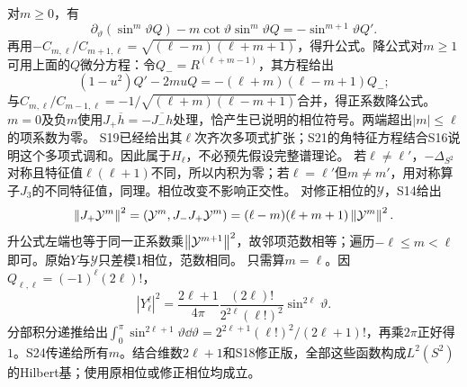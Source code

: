 \documentclass[UTF8,fontset=fandol,11pt]{ctexart}
\begin{document}
对$m\ge0$，有
\[\partial_\vartheta(\sin^m\vartheta Q)-m\cot\vartheta\sin^m\vartheta Q=-\sin^{m+1}\vartheta Q'.\]
再用$-C_{m,\ell}/C_{m+1,\ell}=\sqrt{(\ell-m)(\ell+m+1)}$，得升公式。降公式对$m\ge1$可用上面的$Q$微分方程：令$Q_-=R^{(\ell+m-1)}$，其方程给出
\[(1-u^2)Q'-2muQ=-(\ell+m)(\ell-m+1)Q_-;\]
与$C_{m,\ell}/C_{m-1,\ell}=-1/\sqrt{(\ell+m)(\ell-m+1)}$合并，得正系数降公式。$m=0$及负$m$使用$J_+\overline h=-\overline{J_-h}$处理，恰产生已说明的相位符号。两端超出$|m|\le\ell$的项系数为零。
S19已经给出其$\ell$次齐次多项式扩张；S21的角特征方程结合S16说明这个多项式调和。因此属于$H_\ell$，不必预先假设完整谱理论。
若$\ell\ne\ell'$，$-\Delta_{S^2}$对称且特征值$\ell(\ell+1)$不同，所以内积为零；若$\ell=\ell'$但$m\ne m'$，用对称算子$J_3$的不同特征值，同理。相位改变不影响正交性。
对修正相位的$\mathcal Y$，S14给出
\[\left\lVert J_+\mathcal Y^m\right\rVert^2=(\mathcal Y^m,J_-J_+\mathcal Y^m)=(\ell-m)(\ell+m+1)\left\lVert\mathcal Y^m\right\rVert^2.\]
升公式左端也等于同一正系数乘$\left\lVert\mathcal Y^{m+1}\right\rVert^2$，故邻项范数相等；遍历$-\ell\le m<\ell$即可。原始$Y$与$\mathcal Y$只差模$1$相位，范数相同。
只需算$m=\ell$。因$Q_{\ell,\ell}=(-1)^\ell(2\ell)!$，
\[|Y_\ell^\ell|^2=\frac{2\ell+1}{4\pi}\frac{(2\ell)!}{2^{2\ell}(\ell!)^2}\sin^{2\ell}\vartheta.\]
分部积分递推给出$\int_0^\pi\sin^{2\ell+1}\vartheta\dd\vartheta=2^{2\ell+1}(\ell!)^2/(2\ell+1)!$，再乘$2\pi$正好得$1$。S24传递给所有$m$。结合维数$2\ell+1$和S18修正版，全部这些函数构成$L^2(S^2)$的Hilbert基；使用原相位或修正相位均成立。
\originalpages
\end{document}
